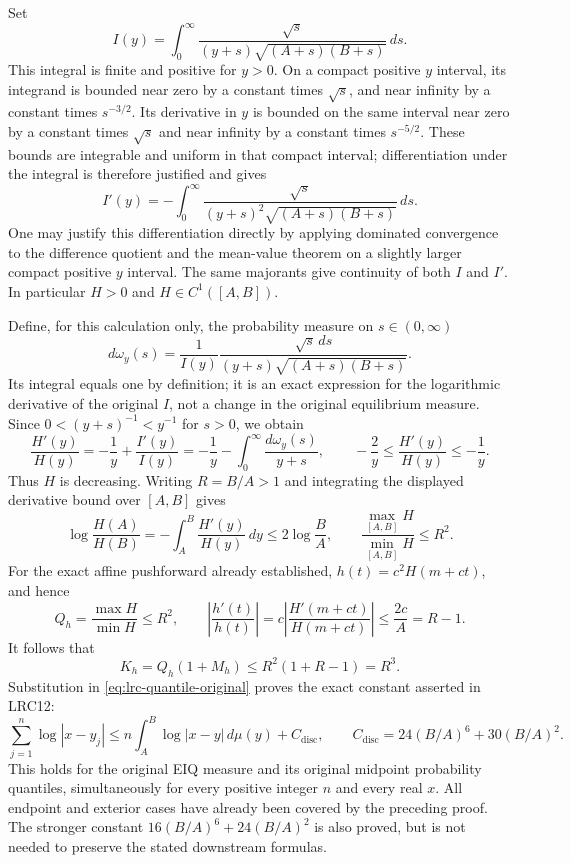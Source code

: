 \documentclass[11pt,a4paper]{article}
\begin{document}
Set
\[
 I(y)=\int_0^\infty
       \frac{\sqrt s}{(y+s)\sqrt{(A+s)(B+s)}}\,ds.
\]
This integral is finite and positive for $y>0$. On a compact
positive $y$ interval, its integrand is bounded near zero by a
constant times $\sqrt s$, and near infinity by a constant times
$s^{-3/2}$. Its derivative in $y$ is bounded on the same interval
near zero by a constant times $\sqrt s$ and near infinity by a
constant times $s^{-5/2}$. These bounds are integrable and uniform
in that compact interval; differentiation under the integral is
therefore justified and gives
\[
 I'(y)=-\int_0^\infty
       \frac{\sqrt s}{(y+s)^2\sqrt{(A+s)(B+s)}}\,ds.
\]
One may justify this differentiation directly by applying dominated
convergence to the difference quotient and the mean-value theorem
on a slightly larger compact positive $y$ interval. The same
majorants give continuity of both $I$ and $I'$. In particular
$H>0$ and $H\in C^1([A,B])$.

Define, for this calculation only, the probability measure on
$s\in(0,\infty)$
\[
 d\omega_y(s)=\frac1{I(y)}
       \frac{\sqrt s\,ds}{(y+s)\sqrt{(A+s)(B+s)}}.
\]
Its integral equals one by definition; it is an exact expression
for the logarithmic derivative of the original $I$, not a change
in the original equilibrium measure. Since $0<(y+s)^{-1}<y^{-1}$
for $s>0$, we obtain
\[
 \frac{H'(y)}{H(y)}
 =-\frac1y+\frac{I'(y)}{I(y)}
 =-\frac1y-\int_0^\infty\frac{d\omega_y(s)}{y+s},
 \qquad
 -\frac2y\leq\frac{H'(y)}{H(y)}\leq-\frac1y.
\]
Thus $H$ is decreasing. Writing $R=B/A>1$ and integrating the
displayed derivative bound over $[A,B]$ gives
\[
 \log\frac{H(A)}{H(B)}
 =-\int_A^B\frac{H'(y)}{H(y)}\,dy
 \leq2\log\frac BA,
 \qquad
 \frac{\max_{[A,B]}H}{\min_{[A,B]}H}\leq R^2.
\]
For the exact affine pushforward already established,
$h(t)=c^2H(m+ct)$, and hence
\[
 Q_h=\frac{\max H}{\min H}\leq R^2,\qquad
 \left|\frac{h'(t)}{h(t)}\right|
 =c\left|\frac{H'(m+ct)}{H(m+ct)}\right|
 \leq\frac{2c}{A}=R-1.
\]
It follows that
\[
 K_h=Q_h(1+M_h)\leq R^2(1+R-1)=R^3.
\]
Substitution in \eqref{eq:lrc-quantile-original} proves the exact
constant asserted in LRC12:
\begin{equation}\label{eq:lrc-eiq-discrepancy}
 \sum_{j=1}^n\log|x-y_j|
 \leq n\int_A^B\log|x-y|\,d\mu(y)
       +C_{\mathrm{disc}},\qquad
 C_{\mathrm{disc}}=24(B/A)^6+30(B/A)^2.
\end{equation}
This holds for the original EIQ measure and its original midpoint
probability quantiles, simultaneously for every positive integer
$n$ and every real $x$. All endpoint and exterior cases have
already been covered by the preceding proof. The stronger constant
$16(B/A)^6+24(B/A)^2$ is also proved, but is not needed to preserve
the stated downstream formulas.
\end{document}

